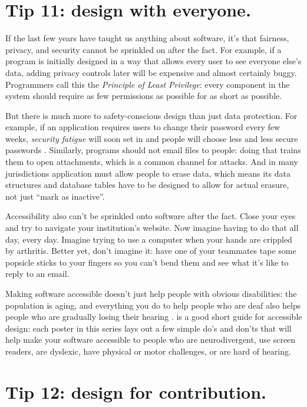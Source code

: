 \documentclass[10pt,letterpaper]{article}
\begin{document}
\section*{Tip 11: design with everyone.}

If the last few years have taught us anything about software,
it's that fairness, privacy, and security cannot be sprinkled on after the fact.
For example,
if a program is initially designed in a way that allows every user to see everyone else's data,
adding privacy controls later will be expensive and almost certainly buggy.
Programmers call this the \emph{Principle of Least Privilege}:
every component in the system should require as few permissions as possible
for as short as possible.

But there is much more to safety-conscious design than just data protection.
For example,
if an application requires users to change their password every few weeks,
\emph{security fatigue} will soon set in
and people will choose less and less secure passwords \cite{Smalls2021}.
Similarly,
programs should not email files to people:
doing that trains them to open attachments,
which is a common channel for attacks.
And in many jurisdictions application must allow people to erase data,
which means its data structures and database tables have to be designed to allow for actual erasure,
not just ``mark as inactive''.

Accessibility also can't be sprinkled onto software after the fact.
Close your eyes and try to navigate your institution's website.
Now imagine having to do that all day, every day.
Imagine trying to use a computer when your hands are crippled by arthritis.
Better yet, don't imagine it:
have one of your teammates tape some popsicle sticks to your fingers so you can't bend them
and see what it's like to reply to an email.

Making software accessible doesn't just help people with obvious disabilities:
the population is aging,
and everything you do to help people who are deaf also helps people
who are gradually losing their hearing \cite{Johnson2017}.
\cite{UKHO} is a good short guide for accessible design:
each poster in this series lays out a few simple do's and don'ts that will help make your software accessible
to people who are neurodivergent,
use screen readers,
are dyslexic,
have physical or motor challenges,
or are hard of hearing.

\section*{Tip 12: design for contribution.}
\end{document}
